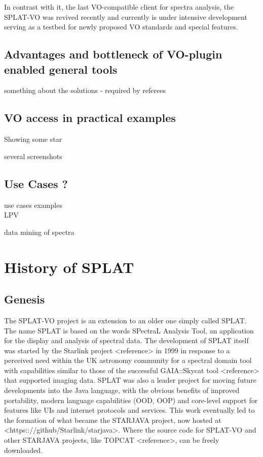 \documentclass[final,authoryear,5p,times,twocolumn]{elsarticle}
\begin{document}
In contrast with it, the last VO-compatible client for spectra analysis, the
SPLAT-VO was revived recently and currently is under intensive development
serving as a testbed for newly proposed VO standards and special features. 

 



\subsection{Advantages and bottleneck of  VO-plugin enabled general tools}


something about the solutions - required by referees





\subsection{VO access in practical examples}


Showing some star 

several screenshots


\subsection{Use Cases ?}

use cases examples\\

LPV

data mining of spectra




\section{History of SPLAT}
\subsection{Genesis}

The SPLAT-VO project is an extension to an older one simply called SPLAT. The
name SPLAT is based on the words SPectraL Analysis Tool, an application for
the display and analysis of spectral data. The development of SPLAT itself was
started by the Starlink project <reference> in 1999 in response to a perceived
need within the UK astronomy community for a spectral domain tool with
capabilities similar to those of the successful GAIA::Skycat tool <reference>
that supported imaging data. SPLAT was also a leader project for moving future
developments into the Java language, with the obvious benefits of improved
portability, modern language capabilities (OOD, OOP) and core-level support for
features like UIs and internet protocols and services. This work eventually
led to the formation of what became the STARJAVA project, now hosted at
<https:://github/Starlink/starjava>. Where the source code for SPLAT-VO and
other STARJAVA projects, like TOPCAT <reference>, can be freely downloaded.
\end{document}
